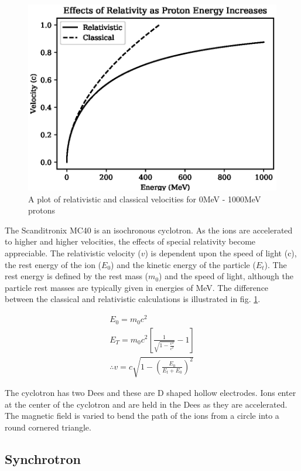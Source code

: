 \begin{figure}[ht]
\begin{center}
\includegraphics[width=.50\linewidth]{chapters/isotope_activation_and_radioactive_decay/plots/relativistic/proton_energy.eps}
\caption{A plot of relativistic and classical velocities for 0MeV - 1000MeV protons}
\label{fig:relitavisticplot}
\end{center}
\end{figure}

The Scanditronix MC40 is an isochronous cyclotron.  As the ions are accelerated to higher and higher velocities, the effects of special relativity become appreciable.  The relativistic velocity ($v$) is dependent upon the speed of light (c), the rest energy of the ion ($E_0$) and the kinetic energy of the particle ($E_t$).  The rest energy is defined by the rest mass ($m_0$) and the speed of light, although the particle rest masses are typically given in energies of MeV.  The difference between the classical and relativistic calculations is illustrated in fig. \ref{fig:relitavisticplot}.

\begin{equation}
\begin{split}
E_0 = m_0 c^2 \\
E_T = m_0 c^2 \left[\frac{1}{\sqrt{1-\frac{v^2}{c^2}}} - 1 \right] \\
\therefore v = c \sqrt{1 - \left(\frac{E_{0}}{E_t + E_{0}}\right)^2}
\end{split}
\label{eq:eqGammaFunction}
\end{equation}

The cyclotron has two Dees and these are D shaped hollow electrodes.  Ions enter at the center of the cyclotron and are held in the Dees as they are accelerated.  The magnetic field is varied to bend the path of the ions from a circle into a round cornered triangle.




\FloatBarrier
\subsection{Synchrotron}

